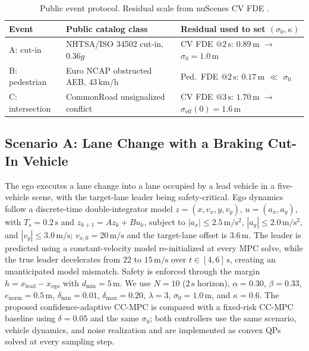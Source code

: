 \documentclass[letterpaper, 10 pt, conference]{ieeeconf}
\begin{document}
{\begin{table}[t]
\centering
\caption{Public event protocol. Residual scale from nuScenes CV FDE \cite{salzmann2020trajectron++}.}
\label{tab:public}
\small
\setlength{\tabcolsep}{3.2pt}
\begin{tabular}{lll}
\toprule
Event & Public catalog class & Residual used to set $(\sigma_0,\kappa)$ \\
\midrule
A: cut-in & NHTSA/ISO 34502 cut-in, $0.36g$ & CV FDE $@2\,\mathrm{s}$: $0.89\,\mathrm{m}$ $\to$ $\sigma_0=1.0\,\mathrm{m}$ \\
B: pedestrian & Euro NCAP obstructed AEB, $43\,\mathrm{km/h}$ & Ped.\ FDE $@2\,\mathrm{s}$: $0.17\,\mathrm{m}$ $\ll$ $\sigma_0$ \\
C: intersection & CommonRoad unsignalized conflict & CV FDE $@3\,\mathrm{s}$: $1.70\,\mathrm{m}$ $\to$ $\sigma_{\mathrm{eff}}(0)=1.6\,\mathrm{m}$ \\
\bottomrule
\end{tabular}
\end{table}
}

\subsection{Scenario A: Lane Change with a Braking Cut-In Vehicle}
\label{sec:sim-lanechange}

The ego executes a lane change into a lane occupied by a lead vehicle in a five-vehicle scene, with the target-lane leader being safety-critical. Ego dynamics follow a discrete-time double-integrator model $z=(x,v_x,y,v_y)$, $u=(a_x,a_y)$, with $T_s=0.2\,\mathrm{s}$ and $z_{k+1}=Az_k+Bu_k$, subject to $|a_x|\le2.5\,\mathrm{m/s^2}$, $|a_y|\le2.0\,\mathrm{m/s^2}$, and $|v_y|\le3.0\,\mathrm{m/s}$; $v_{x,0}=20\,\mathrm{m/s}$ and the target-lane offset is $3.6\,\mathrm{m}$. The leader is predicted using a constant-velocity model re-initialized at every MPC solve, while the true leader decelerates from $22$ to $15\,\mathrm{m/s}$ over $t\in[4,6]\,\mathrm{s}$, creating an unanticipated model mismatch. Safety is enforced through the margin $h=x_{\mathrm{lead}}-x_{\mathrm{ego}}$ with $d_{\min}=5\,\mathrm{m}$. We use $N=10$ ($2\,\mathrm{s}$ horizon), $\alpha=0.30$, $\beta=0.33$, $e_{\mathrm{norm}}=0.5\,\mathrm{m}$, $\delta_{\min}=0.01$, $\delta_{\max}=0.20$, $\lambda=3$, $\sigma_0=1.0\,\mathrm{m}$, and $\kappa=0.6$. The proposed confidence-adaptive CC-MPC is compared with a fixed-risk CC-MPC baseline using $\delta=0.05$ and the same $\sigma_0$; both controllers use the same scenario, vehicle dynamics, and noise realization and are implemented as convex QPs solved at every sampling step.
\end{document}

